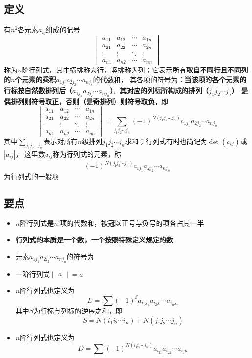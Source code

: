\documentclass[UTF8]{ctexart}
\newcommand{\abs}[1]{{\left|{#1}\right|}}
\begin{document}
\subsection*{定义}
有$n^2$各元素$a_{ij}$组成的记号
\[\begin{vmatrix}
a_{11}&a_{12}&\cdots&a_{1n}\\
a_{21}&a_{22}&\cdots&a_{2n}\\
\vdots&\vdots&\ddots&\vdots\\
a_{n1}&a_{n2}&\cdots&a_{nn}
\end{vmatrix}\]
称为$n$阶行列式，其中横排称为行，竖排称为列；它表示所有\textbf{取自不同行且不同列的$n$个元素的乘积$a_{1j_1}a_{2j_2}\cdots a_{nj_n}$}的代数和，
其各项的符号为：\textbf{当该项的各个元素的行标按自然数排列后（$a_{1j_1}a_{2j_2}\cdots a_{nj_n}$），其对应的列标所构成的排列（$j_1j_2\cdots j_n$）
是偶排列则符号取正，否则（是奇排列）则符号取负}，即
\[\begin{vmatrix}
a_{11}&a_{12}&\cdots&a_{1n}\\
a_{21}&a_{22}&\cdots&a_{2n}\\
\vdots&\vdots&\ddots&\vdots\\
a_{n1}&a_{n2}&\cdots&a_{nn}
\end{vmatrix}=
\sum_{j_1j_2\cdots j_n}(-1)^{N(j_1j_2\cdots j_n)}a_{1j_1}a_{2j_2}\cdots a_{nj_n}
\]
其中$\displaystyle\sum_{j_1j_2\cdots j_n}$表示对所有$n$级排列$j_1j_2\cdots j_n$求和；行列式有时也简记为$\det(a_{ij})$或$\abs{a_{ij}}$，
这里数$a_{ij}$称为行列式的元素，称
\[(-1)^{N(j_1j_2\cdots j_n)}a_{1j_1}a_{2j_2}\cdots a_{nj_n}\]
为行列式的一般项

\subsection*{要点}
\begin{itemize}
  \item $n$阶行列式是$n!$项的代数和，被冠以正号与负号的项各占其一半
  \item \textbf{行列式的本质是一个数，一个按照特殊定义规定的数}
  \item 元素$a_{1j_1}a_{2j_2}\cdots a_{nj_n}$的符号为
  \item 一阶行列式$\begin{vmatrix}a\end{vmatrix}=a$
  \item $n$阶行列式也定义为
  \[D=\sum(-1)^Sa_{i_1j_1}a_{i_2j_2}\cdots a_{i_nj_n}\]
  其中$S$为行标与列标的逆序之和，即
  \[S=N(i_1i_2\cdots i_n)+N(j_1j_2\cdots j_n)\]
  \item $n$阶行列式也定义为
  \[D=\sum(-1)^{N(i_1i_2\cdots i_n)}a_{i_11}a_{i_22}\cdots a_{i_nn}\]
\end{itemize}
\end{document}
